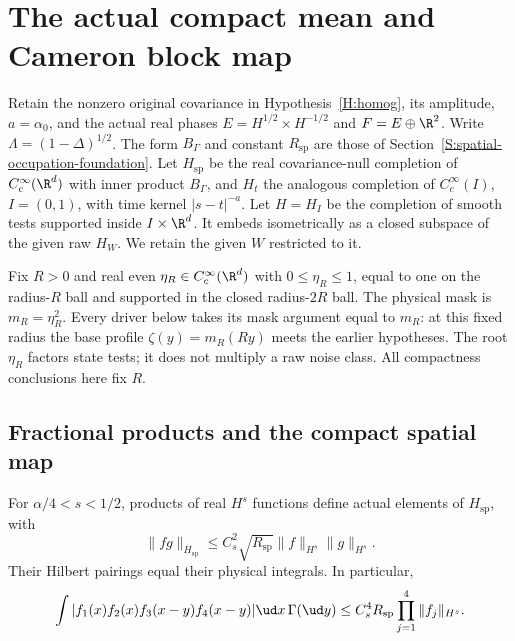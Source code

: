 \section{The actual compact mean and Cameron block map}
\label{S:actual-cameron-mean}

Retain the nonzero original covariance in Hypothesis~\ref{H:homog},
its amplitude, $a=\alpha_0$, and the actual real phases
$E=H^{1/2}\times H^{-1/2}$ and $F=E\oplus\R^2$.
Write $\Lambda=(1-\Delta)^{1/2}$.
The form $B_\Gamma$ and constant $R_{\mathrm{sp}}$ are those of
Section~\ref{S:spatial-occupation-foundation}.
Let $H_{\mathrm{sp}}$ be the real covariance-null completion of
$C_c^\infty(\R^d)$ with inner product $B_\Gamma$, and $H_t$ the
analogous completion of $C_c^\infty(I)$, $I=(0,1)$, with time
kernel $|s-t|^{-a}$.
Let $H=H_I$ be the completion of smooth tests supported inside
$I\times\R^d$. It embeds isometrically as a closed subspace of
the given raw $H_W$. We retain the given $W$ restricted to it.

Fix $R>0$ and real even $\eta_R\in C_c^\infty(\R^d)$ with
$0\le\eta_R\le1$, equal to one on the radius-$R$ ball and supported
in the closed radius-$2R$ ball. The physical mask is
$m_R=\eta_R^2$. Every driver below takes its mask argument equal to
$m_R$: at this fixed radius the base profile
$\zeta(y)=m_R(Ry)$ meets the earlier hypotheses.
The root $\eta_R$ factors state tests; it does not multiply a raw
noise class. All compactness conclusions here fix $R$.

\subsection{Fractional products and the compact spatial map}

\begin{lemma}
  \label{L:cameron-fractional-products}
  For $\alpha/4<s<1/2$, products of real $H^s$ functions define
  actual elements of $H_{\mathrm{sp}}$, with
  \begin{equation}\label{E:cameron-fractional-product}
    \|fg\|_{H_{\mathrm{sp}}}
    \le C_s^2\sqrt{R_{\mathrm{sp}}}\|f\|_{H^s}\|g\|_{H^s}.
  \end{equation}
  Their Hilbert pairings equal their physical integrals. In particular,
  \begin{equation}\label{E:cameron-fractional-absolute}
    \int|f_1(x)f_2(x)f_3(x-y)f_4(x-y)|\ud x\,\Gamma(\ud y)
    \le C_s^4R_{\mathrm{sp}}\prod_{j=1}^4\|f_j\|_{H^s}.
  \end{equation}
\end{lemma}


